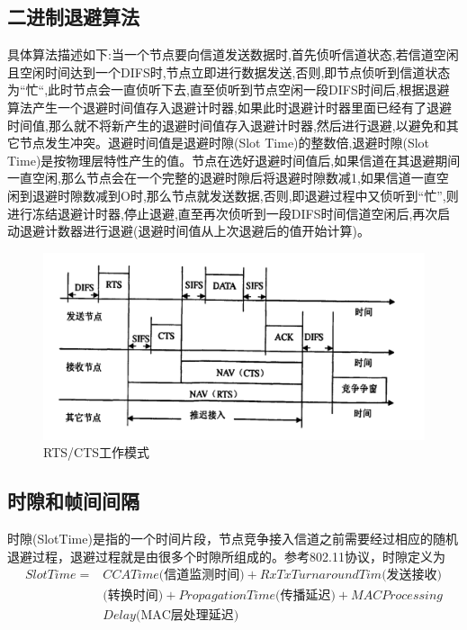 \subsection{二进制退避算法}
具体算法描述如下:当一个节点要向信道发送数据时,首先侦听信道状态,若信道空闲且空闲时间达到一个DIFS时,节点立即进行数据发送,否则,即节点侦听到信道状态为“忙“,此时节点会一直侦听下去,直至侦听到节点空闲一段DIFS时间后,根据退避算法产生一个退避时间值存入退避计时器,如果此时退避计时器里面已经有了退避时间值,那么就不将新产生的退避时间值存入退避计时器,然后进行退避,以避免和其它节点发生冲突。退避时间值是退避时隙(Slot Time)的整数倍,退避时隙(Slot Time)是按物理层特性产生的值。节点在选好退避时间值后,如果信道在其退避期间一直空闲,那么节点会在一个完整的退避时隙后将退避时隙数减1,如果信道一直空闲到退避时隙数减到O时,那么节点就发送数据,否则,即退避过程中又侦听到“忙”,则进行冻结退避计时器,停止退避,直至再次侦听到一段DIFS时间信道空闲后,再次启动退避计数器进行退避(退避时间值从上次退避后的值开始计算)。
\begin{figure}[ht]
	\centering
	\includegraphics[scale=0.2]{figures/RC.png}
	\caption{
		RTS/CTS工作模式
	}
	\label{fig:example}
\end{figure}
\subsection{时隙和帧间间隔}
时隙(SlotTime)是指的一个时间片段，节点竞争接入信道之前需要经过相应的随机退避过程，退避过程就是由很多个时隙所组成的。参考802.11协议，时隙定义为
\begin{equation}
\begin{aligned}
SlotTime=&CCATime\mbox{(信道监测时间)}+RxTxTurnaroundTim\mbox{(发送接收)}\\&\mbox{(转换时间)}+PropagationTime\mbox{(传播延迟)}+MACProcessing\\&Delay\mbox{(MAC层处理延迟)}
\end{aligned}
\end{equation}

